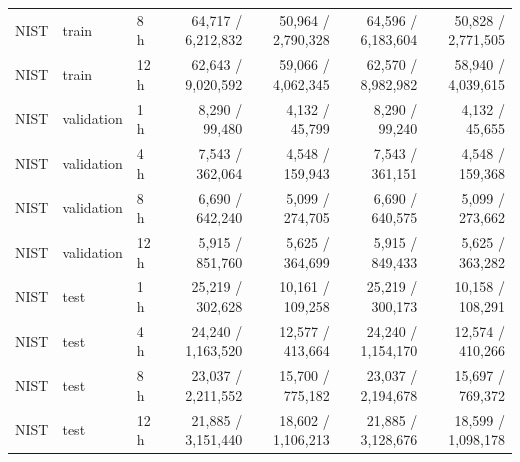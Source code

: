 \begin{longtable}{lllrrrr}
NIST & train & 8 h & 64,717 / 6,212,832 & 50,964 / 2,790,328 & 64,596 / 6,183,604 & 50,828 / 2,771,505\\
NIST & train & 12 h & 62,643 / 9,020,592 & 59,066 / 4,062,345 & 62,570 / 8,982,982 & 58,940 / 4,039,615\\
NIST & validation & 1 h & 8,290 / 99,480 & 4,132 / 45,799 & 8,290 / 99,240 & 4,132 / 45,655\\
NIST & validation & 4 h & 7,543 / 362,064 & 4,548 / 159,943 & 7,543 / 361,151 & 4,548 / 159,368\\
NIST & validation & 8 h & 6,690 / 642,240 & 5,099 / 274,705 & 6,690 / 640,575 & 5,099 / 273,662\\
NIST & validation & 12 h & 5,915 / 851,760 & 5,625 / 364,699 & 5,915 / 849,433 & 5,625 / 363,282\\
NIST & test & 1 h & 25,219 / 302,628 & 10,161 / 109,258 & 25,219 / 300,173 & 10,158 / 108,291\\
NIST & test & 4 h & 24,240 / 1,163,520 & 12,577 / 413,664 & 24,240 / 1,154,170 & 12,574 / 410,266\\
NIST & test & 8 h & 23,037 / 2,211,552 & 15,700 / 775,182 & 23,037 / 2,194,678 & 15,697 / 769,372\\
NIST & test & 12 h & 21,885 / 3,151,440 & 18,602 / 1,106,213 & 21,885 / 3,128,676 & 18,599 / 1,098,178\\
\bottomrule\end{longtable}
